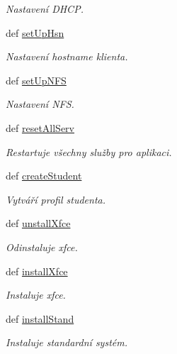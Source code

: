\begin{DoxyCompactItemize}
\begin{DoxyCompactList}\small\item\em Nastavení D\-H\-C\-P. \end{DoxyCompactList}\item 
def \hyperlink{classConfSys_1_1ConfSys_a361378fc045e56711c9bde9874fc06bf}{set\-Up\-Hsn}
\begin{DoxyCompactList}\small\item\em Nastavení hostname klienta. \end{DoxyCompactList}\item 
def \hyperlink{classConfSys_1_1ConfSys_a787b4f7c745fb7523086a6a97a79eecf}{set\-Up\-N\-F\-S}
\begin{DoxyCompactList}\small\item\em Nastavení N\-F\-S. \end{DoxyCompactList}\item 
def \hyperlink{classConfSys_1_1ConfSys_a75def3f5e902bb94b3704db721d8b573}{reset\-All\-Serv}
\begin{DoxyCompactList}\small\item\em Restartuje všechny služby pro aplikaci. \end{DoxyCompactList}\item 
def \hyperlink{classConfSys_1_1ConfSys_a086abe49a00bb5d105cc7f8b8a4db49e}{create\-Student}
\begin{DoxyCompactList}\small\item\em Vytváří profil studenta. \end{DoxyCompactList}\item 
def \hyperlink{classConfSys_1_1ConfSys_a0992f277e8ca9e28938ca2b2dde59ea1}{unstall\-Xfce}
\begin{DoxyCompactList}\small\item\em Odinstaluje xfce. \end{DoxyCompactList}\item 
def \hyperlink{classConfSys_1_1ConfSys_a3b5dad79e382f77b71218611bb97a25b}{install\-Xfce}
\begin{DoxyCompactList}\small\item\em Instaluje xfce. \end{DoxyCompactList}\item 
def \hyperlink{classConfSys_1_1ConfSys_a95ef7393f7d7dbee78bced240d3554a2}{install\-Stand}
\begin{DoxyCompactList}\small\item\em Instaluje standardní systém. \end{DoxyCompactList}\item 

\end{DoxyCompactItemize}
